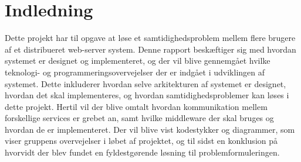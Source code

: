 \chapter{Indledning}\label{ch:indledning}
Dette projekt har til opgave at løse et samtidighedsproblem mellem flere brugere af et distribueret web-server system.
Denne rapport beskæftiger sig med hvordan systemet er designet og implementeret, og der vil blive gennemgået hvilke teknologi- og programmeringsovervejelser der er indgået i udviklingen af systemet. Dette inkluderer hvordan selve arkitekturen af systemet er designet, hvordan det skal implementeres, og hvordan samtidighedsproblemer kan løses i dette projekt. Hertil vil der blive omtalt hvordan kommunikation mellem forskellige services er grebet an, samt hvilke middleware der skal bruges og hvordan de er implementeret. Der vil blive vist kodestykker og diagrammer, som viser gruppens overvejelser i løbet af projektet, og til sidst en konklusion på hvorvidt der blev fundet en fyldestgørende løsning til problemformuleringen. 